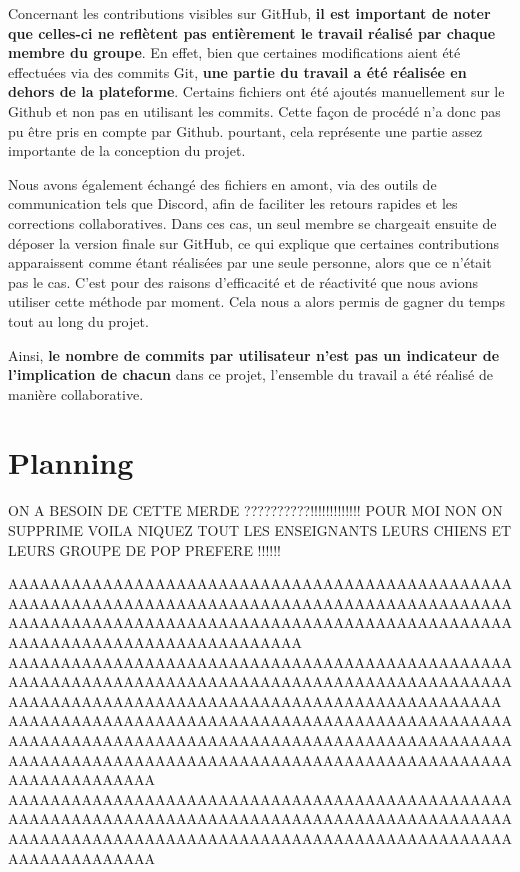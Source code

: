 \documentclass[mstat,12pt]{unswthesis}
\begin{document}
Concernant les contributions visibles sur GitHub, \textbf{il est important de noter que celles-ci ne reflètent pas entièrement le travail réalisé par chaque membre du groupe}.
En effet, bien que certaines modifications aient été effectuées via des commits Git, \textbf{une partie du travail a été réalisée en dehors de la plateforme}.
Certains fichiers ont été ajoutés manuellement sur le Github et non pas en utilisant les commits. Cette façon de procédé n'a donc pas pu être pris en compte par Github.
pourtant, cela représente une partie assez importante de la conception du projet.

Nous avons également échangé des fichiers en amont, via des outils de communication tels que Discord, afin de faciliter les retours rapides et les corrections collaboratives.
Dans ces cas, un seul membre se chargeait ensuite de déposer la version finale sur GitHub, ce qui explique que certaines contributions apparaissent comme
étant réalisées par une seule personne, alors que ce n'était pas le cas. C'est pour des raisons d’efficacité et de réactivité que nous avions utiliser cette méthode par moment.
Cela nous a alors permis de gagner du temps tout au long du projet.

Ainsi, \textbf{le nombre de commits par utilisateur n'est pas un indicateur de l’implication de chacun} dans ce projet, l’ensemble du travail a été réalisé de manière
collaborative.

\hypertarget{planning}{%
\section{Planning}\label{Planning}}

ON A BESOIN DE CETTE MERDE ??????????!!!!!!!!!!!!!
POUR MOI NON ON SUPPRIME VOILA NIQUEZ TOUT LES ENSEIGNANTS LEURS CHIENS ET LEURS GROUPE DE POP PREFERE !!!!!!

AAAAAAAAAAAAAAAAAAAAAAAAAAAAAAAAAAAAAAAAAAAAAAAAAAAAAAAAAAAAAAAAAAAAAAAAAAAAAAAAAAAAAAAAAAAAAAAAAAAAAAAAAAAAAAAAAAAAAAAAAAAAAAAAAAAAAAAAAAAAAAAAAAAAAAAAAAAAAAAAAAAAAAAAAAAA
AAAAAAAAAAAAAAAAAAAAAAAAAAAAAAAAAAAAAAAAAAAAAAAAAAAAAAAAAAAAAAAAAAAAAAAAAAAAAAAAAAAAAAAAAAAAAAAAAAAAAAAAAAAAAAAAAAAAAAAAAAAAAAAAAAAAAAAAAAAAAAA
AAAAAAAAAAAAAAAAAAAAAAAAAAAAAAAAAAAAAAAAAAAAAAAAAAAAAAAAAAAAAAAAAAAAAAAAAAAAAAAAAAAAAAAAAAAAAAAAAAAAAAAAAAAAAAAAAAAAAAAAAAAAAAAAAAAAAAAAAAAAAAAAAAAAAAAAAAAAAA
AAAAAAAAAAAAAAAAAAAAAAAAAAAAAAAAAAAAAAAAAAAAAAAAAAAAAAAAAAAAAAAAAAAAAAAAAAAAAAAAAAAAAAAAAAAAAAAAAAAAAAAAAAAAAAAAAAAAAAAAAAAAAAAAAAAAAAAAAAAAAAAAAAAAAAAAAAAAAA
\end{document}
